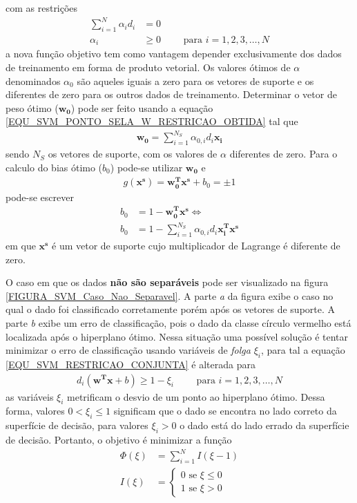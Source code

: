 com as restrições
\begin{align}
\sum\limits_{i=1}^{N} \alpha_{i}d_{i} &= 0 \\
\alpha_{i} &\geq 0	\qquad \textrm{ para } i = 1,2,3,\ldots, N
\end{align}
a nova função objetivo tem como vantagem depender exclusivamente dos dados de treinamento em forma de produto vetorial. Os valores ótimos de \(\alpha\) denominados \(\alpha_{0}\) são aqueles iguais a zero para os vetores de suporte e os diferentes de zero para os outros dados de treinamento. Determinar o vetor de peso ótimo (\(\mathbf{w_{0}}\)) pode ser feito usando a equação \eqref{EQU_SVM_PONTO_SELA_W_RESTRICAO_OBTIDA} tal que
\begin{align}
\mathbf{w_{0}} = \sum\limits_{i=1}^{N_{S}} \alpha_{0,i}d_{i}\mathbf{x_{i}} \label{EQU_SVM_W_OTIMO}
\end{align}
sendo \(N_{S}\) os vetores de suporte, com os valores de \(\alpha\) diferentes de zero. Para o calculo do bias ótimo (\(b_{0}\)) pode-se utilizar \(\mathbf{w_{0}}\) e 
\begin{align}
g(\mathbf{x^{s}}) = \mathbf{w_{0}^{T}}\mathbf{x^{s}} + b_{0} = \pm 1
\end{align}
pode-se escrever
\begin{align}
b_{0} &= 1 - \mathbf{w_{0}^{T}}\mathbf{x^{s}} \Leftrightarrow \\
b_{0} &= 1 - \sum\limits_{i=1}^{N_{S}} \alpha_{0,i}d_{i}\mathbf{x_{i}^{T}}\mathbf{x^{s}}
\end{align}
em que \(\mathbf{x^{s}}\) é um vetor de suporte cujo multiplicador de Lagrange é diferente de zero. 

O caso em que os dados \textbf{não são separáveis} pode ser visualizado na figura \ref{FIGURA_SVM_Caso_Nao_Separavel}. A parte \emph{a} da figura exibe o caso no qual o dado foi classificado corretamente porém após os vetores de suporte. A parte \emph{b} exibe um erro de classificação, pois o dado da classe círculo vermelho está localizada após o hiperplano ótimo. Nessa situação uma possível solução é tentar minimizar o erro de classificação usando variáveis de \emph{folga} \(\xi_{i}\), para tal a equação \eqref{EQU_SVM_RESTRICAO_CONJUNTA} é alterada para 
\begin{align}
d_{i}(\mathbf{w^{T}}\mathbf{x} + b )  \geq 1 - \xi_{i} \qquad \textrm{ para } i = 1, 2, 3, \ldots, N
\end{align}
as variáveis \(\xi_{i}\) metrificam o desvio de um ponto ao hiperplano ótimo. Dessa forma, valores \(0 < \xi_{i} \leq 1\) significam que o dado se encontra no lado correto da superfície de decisão, para valores \(\xi_{i} > 0\) o dado está do lado errado da superfície de decisão. Portanto, o objetivo é minimizar a função
\begin{align}
\Phi(\xi) &= \sum\limits_{i=1}^{N}I(\xi -1) \label{EQU_MINIMIZAR_MARGEM_SUAVE}\\
I(\xi) 	  &= \begin{cases}
				0 \textrm{ se } \xi \leq 0 \\
				1 \textrm{ se } \xi > 0 
			 \end{cases} 
\end{align}


